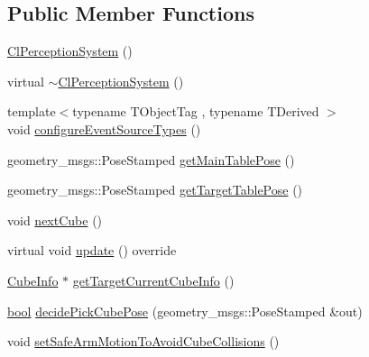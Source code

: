 \subsection*{Public Member Functions}
\begin{DoxyCompactItemize}
\item 
\hyperlink{classsm__moveit__4_1_1cl__perception__system_1_1ClPerceptionSystem_aeb969985d995c4ba91f1f2f693fe2c3a}{Cl\+Perception\+System} ()
\item 
virtual \hyperlink{classsm__moveit__4_1_1cl__perception__system_1_1ClPerceptionSystem_aa914df8a54f247c92cb0e7c3568b9e44}{$\sim$\+Cl\+Perception\+System} ()
\item 
{\footnotesize template$<$typename T\+Object\+Tag , typename T\+Derived $>$ }\\void \hyperlink{classsm__moveit__4_1_1cl__perception__system_1_1ClPerceptionSystem_a693927b659a3f739f2bc2ac403df0f1a}{configure\+Event\+Source\+Types} ()
\item 
geometry\+\_\+msgs\+::\+Pose\+Stamped \hyperlink{classsm__moveit__4_1_1cl__perception__system_1_1ClPerceptionSystem_a234d70a76bb5bf73f23d420c2b541632}{get\+Main\+Table\+Pose} ()
\item 
geometry\+\_\+msgs\+::\+Pose\+Stamped \hyperlink{classsm__moveit__4_1_1cl__perception__system_1_1ClPerceptionSystem_a84da4b68fddd1b2c81d69d5f7aafeb94}{get\+Target\+Table\+Pose} ()
\item 
void \hyperlink{classsm__moveit__4_1_1cl__perception__system_1_1ClPerceptionSystem_adb892199c1e7eb48d41e501a2b0ec5e8}{next\+Cube} ()
\item 
virtual void \hyperlink{classsm__moveit__4_1_1cl__perception__system_1_1ClPerceptionSystem_a91de8cf71c93738f8bcbea388c84a5dd}{update} () override
\item 
\hyperlink{structsm__moveit__4_1_1cl__perception__system_1_1CubeInfo}{Cube\+Info} $\ast$ \hyperlink{classsm__moveit__4_1_1cl__perception__system_1_1ClPerceptionSystem_ac4b944cebb2055a85a33129665df5dcf}{get\+Target\+Current\+Cube\+Info} ()
\item 
\hyperlink{classbool}{bool} \hyperlink{classsm__moveit__4_1_1cl__perception__system_1_1ClPerceptionSystem_af1143d68db667021480383673244bb04}{decide\+Pick\+Cube\+Pose} (geometry\+\_\+msgs\+::\+Pose\+Stamped \&out)
\item 
void \hyperlink{classsm__moveit__4_1_1cl__perception__system_1_1ClPerceptionSystem_a5304dc8734488564093525dfe4f4bcd1}{set\+Safe\+Arm\+Motion\+To\+Avoid\+Cube\+Collisions} ()
\item 

\end{DoxyCompactItemize}
